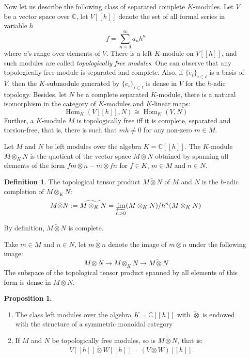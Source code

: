 \documentclass[8pt]{article}
\theoremstyle{definition}
\newtheorem{definition}{Definition}[section]
\theoremstyle{definition}
\theoremstyle{definition}
\theoremstyle{definition}
\theoremstyle{definition}
\theoremstyle{definition}
\theoremstyle{definition}
\newtheorem{prop}{Proposition}[section]
\theoremstyle{definition}
\theoremstyle{definition}
\theoremstyle{definition}
\theoremstyle{definition}
\theoremstyle{definition}
\theoremstyle{definition}
\theoremstyle{definition}
\theoremstyle{question}
\newcommand{\tildetimes}[0]{\widetilde{\otimes}}
\begin{document}
Now let us describe the following class of separated complete $K$-modules. Let $V$ be a vector space over $\mathbb{C}$,
let $V[[h]]$ denote the set of all formal series in variable $h$
\[
f = \sum \limits_{n = 0}^{\infty} a_n h^n
\]
where $a$'s range over elements of $V$. There is a left $K$-module on $V[[h]]$, and such modules are called 
\emph{topologically free modules}. One can observe that any topologically free module is separated and complete. Also,
if $\{ e_i \}_{i \in I}$ is a basis of $V$, then the $K$-submodule generated by $\{ e_i \}_{i \in I}$ is dense 
in $V$ for the $h$-adic topology. Besides, let $N$ be a complete separated $K$-module, there is a natural isomorphism
in the category of $K$-modules and $K$-linear maps:
\[
\operatorname{Hom}_K(V[[h]], N) \cong \operatorname{Hom}_K(V, N)
\]
Further, a $K$-module $M$ is topologically free iff it is complete, separated and torsion-free, that is,
there is such that $m h \neq 0$ for any non-zero $m \in M$.

Let $M$ and $N$ be left modules over the algebra $K = \mathbb{C}[[h]]$. The $K$-module 
$M \otimes_K N$ is the quotient of the vector space $M \otimes N$ obtained by spanning all
elements of the form $fm \otimes n - m \otimes fn$ for $f \in K$, $m \in M$ and $n \in N$.

\begin{definition}
  The topological tensor product $M \widetilde{\otimes} N$ of $M$ and $N$ is the $h$-adic completion of $M \otimes_K N$:
  \[
  M \widetilde{\otimes} N := \widetilde{M \otimes_K N} = \varprojlim \limits_{n > 0} (M \otimes_K N) / h^n (M \otimes_K N)
  \]
\end{definition}
By definition, $M \widetilde{\otimes} N$ is complete.

Take $m \in M$ and $n \in N$, let $m \widetilde{\otimes} n$ denote the image of $m \otimes n$ under the following image:
\[
M \otimes N \rightarrow M \otimes_K N \rightarrow M \widetilde{\otimes} N
\]
The subspace of the topological tensor product spanned by all elements of this form is dense in $M \otimes N$.

\begin{prop}~\label{tensor:of:top:free:modules}
\begin{enumerate}
  \item The class left modules over the algebra $K = \mathbb{C}[[h]]$ with $\widetilde{\otimes}$ is endowed with the structure of a symmetric monoidal category
  \item If $M$ and $N$ be topologically free modules, so is $M \widetilde{\otimes} N$, that is:
  \[
  V[[h]] \tildetimes W[[h]] = (V \otimes W)[[h]].
  \]
\end{enumerate}
\end{prop}
\end{document}

